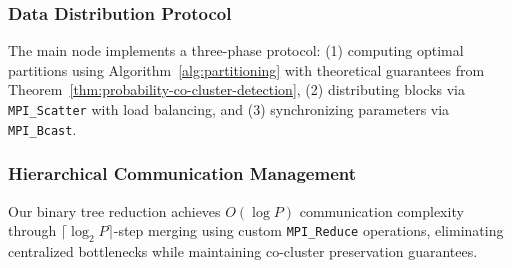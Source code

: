 \documentclass[journal]{IEEEtran}
\theoremstyle{definition}
\theoremstyle{remark} %
\begin{document}
{\color{blue}
\subsubsection{Data Distribution Protocol}
\label{subsec:data-distribution-protocol}
The main node implements a three-phase protocol: (1) computing optimal partitions using Algorithm~\ref{alg:partitioning} with theoretical guarantees from Theorem~\ref{thm:probability-co-cluster-detection}, (2) distributing blocks via \texttt{MPI\_Scatter} with load balancing, and (3) synchronizing parameters via \texttt{MPI\_Bcast}.

\subsubsection{Hierarchical Communication Management}
\label{subsec:hierarchical-communication-management}
Our binary tree reduction achieves $O(\log P)$ communication complexity through $\lceil \log_2 P \rceil$-step merging using custom \texttt{MPI\_Reduce} operations, eliminating centralized bottlenecks while maintaining co-cluster preservation guarantees.
}
\end{document}
